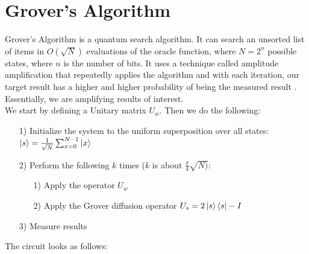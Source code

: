 \documentclass[11pt]{article} %
\begin{document}
\section{Grover's Algorithm}{}
Grover's Algorithm is a quantum search algorithm. It can search an unsorted list of items in $O(\sqrt{N})$ evaluations of the oracle function, where $ N = 2^{n}$ possible states, where $n$ is the number of bits. It uses a technique called amplitude amplification that repeatedly applies the algorithm and with each iteration, our target result has a higher and higher probability of being the measured result \cite{4}. Essentially, we are amplifying results of interest.\\

\noindent We start by defining a Unitary matrix $U_w$. Then we do the following:

\begin{itemize}

\item[1)] Initialize the system to the uniform superposition over all states:\\

$ \ket{s} = \frac{1}{\sqrt{N}}  \sum_{x = 0}^{N - 1} \ket{x}$

\item[2)] Perform the following $k$ times ($k$ is about $\frac{\pi}{4} \sqrt{N)}$:

\begin{itemize}
\item[1)] Apply the operator $U_w$
\item[2)] Apply the Grover diffusion operator $U_s = 2 \ket{s} \bra{s} - I$
\end{itemize}
\item[3)] Measure results
\end{itemize}

The circuit looks as follows:\\
\end{document}
